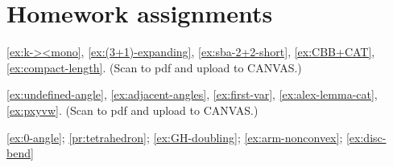 \chapter*{Homework assignments}

\ref{ex:k-><mono},
\ref{ex:(3+1)-expanding},
\ref{ex:sba-2+2-short},
\ref{ex:CBB+CAT},
\ref{ex:compact-length}.
(Scan to pdf and upload to CANVAS.)

\ref{ex:undefined-angle},
\ref{ex:adjacent-angles},
\ref{ex:first-var},
\ref{ex:alex-lemma-cat},
\ref{ex:pxyvw}.
(Scan to pdf and upload to CANVAS.)

\ref{ex:0-angle};
\ref{pr:tetrahedron};
\ref{ex:GH-doubling};
\ref{ex:arm-nonconvex};
\ref{ex:disc-bend}
